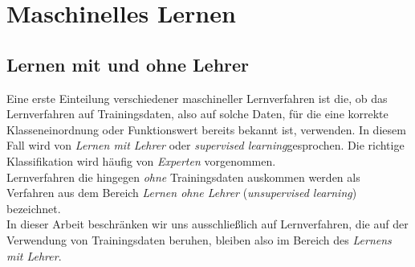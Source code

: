 \documentclass[fontsize=11pt]{scrartcl}
\begin{document}
        \section{Maschinelles Lernen}
            
            \subsection{Lernen mit und ohne Lehrer}
                Eine erste Einteilung verschiedener maschineller Lernverfahren ist die, ob das Lernverfahren auf Trainingsdaten, also auf solche Daten, für die eine korrekte Klasseneinordnung oder Funktionswert bereits bekannt ist, verwenden. In diesem Fall wird von \emph{Lernen mit Lehrer} oder \emph{supervised learning}gesprochen. Die richtige Klassifikation wird häufig von \emph{Experten} vorgenommen.\cite{ertel2016}
                \\
                Lernverfahren die hingegen \emph{ohne} Trainingsdaten auskommen werden als Verfahren aus dem Bereich \emph{Lernen ohne Lehrer} (\emph{unsupervised learning}) bezeichnet.\\
                In dieser Arbeit beschränken wir uns ausschließlich auf Lernverfahren, die auf der Verwendung von Trainingsdaten beruhen, bleiben also im Bereich des \emph{Lernens mit Lehrer}.
\end{document}
